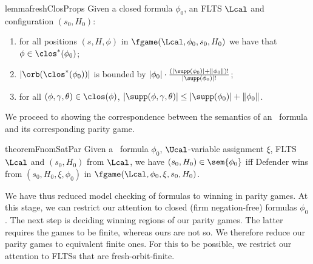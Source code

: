 \begin{restatable}{lemma}{freshClosProps}\label{lem:freshClosProps}
Given a closed formula $\phi_0$, an FLTS $\Lcal$ and configuration $(s_0,H_0)$:
    \begin{enumerate}
                \item\label{lem:freshClosProps:2} for all positions $(s,H,\phi)$ in $\fgame(\Lcal,\phi_0, s_0,H_0)$ we have that $\phi\in\clos^*(\phi_0)$; 
        \item\label{lem:freshClosProps:3} $|\orb(\clos^*(\phi_0))|$ is bounded by $|\phi_0|\cdot \frac{(|\supp(\phi_0)| + \|\phi_0\|)!}{|\supp(\phi_0)|!}$;
\item\label{lem:freshClosProps:4} for all $(\phi,\gamma,\theta)\in\clos(\phi)$, $|\supp(\phi,\gamma,\theta)| \le |\supp(\phi_0)| + \|\phi_0\|$. 
    \end{enumerate}
\end{restatable}




We proceed to showing the correspondence between the semantics of an \fhml\ formula and its corresponding parity game.
\begin{restatable}{theorem}{FnomSatPar}\label{thm:FnomSatPar}     Given a \fhml\ formula $\phi_0$,
    $\Ucal$-variable assignment $\xi$,
    FLTS $\Lcal$ and $(s_0, H_0)$ from $\Lcal$, we have $(s_0, H_0) \in \sem{\phi_0}$ iff Defender wins from $(s_0, H_0,\xi, \phi_0)$ in $\fgame(\Lcal, \phi_0, \xi, s_0,H_0)$.
\end{restatable}

We have thus reduced model checking of formulas to winning in parity games. 
At this stage, we can restrict our attention to closed (firm negation-free) formulas $\phi_0$.
The next step is deciding
winning regions of our parity games. The latter requires the games to be finite, whereas ours are not so. We therefore reduce our parity games to equivalent finite ones.
For this to be possible, we restrict our attention to FLTSs that are fresh-orbit-finite.

